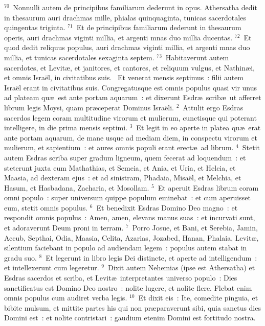 ${}^{70}$~Nonnulli autem de principibus familiarum dederunt in opus. Athersatha dedit in thesaurum auri drachmas mille, phialas quinquaginta, tunicas sacerdotales quingentas triginta.
${}^{71}$~Et de principibus familiarum dederunt in thesaurum operis, auri drachmas viginti millia, et argenti mnas duo millia ducentas.
${}^{72}$~Et quod dedit reliquus populus, auri drachmas viginti millia, et argenti mnas duo millia, et tunicas sacerdotales sexaginta septem.
${}^{73}$~Habitaverunt autem sacerdotes, et Levit\ae , et janitores, et cantores, et reliquum vulgus, et Nathin\ae i, et omnis Isra\"el, in civitatibus suis.
~Et venerat mensis septimus~: filii autem Isra\"el erant in civitatibus suis. Congregatusque est omnis populus quasi vir unus ad plateam qu\ae\ est ante portam aquarum~: et dixerunt Esdr\ae\ scrib\ae\ ut afferret librum legis Moysi, quam pr\ae ceperat Dominus Isra\"eli.
${}^{2}$~Attulit ergo Esdras sacerdos legem coram multitudine virorum et mulierum, cunctisque qui poterant intelligere, in die prima mensis septimi.
${}^{3}$~Et legit in eo aperte in platea qu\ae\ erat ante portam aquarum, de mane usque ad mediam diem, in conspectu virorum et mulierum, et sapientium~: et aures omnis populi erant erect\ae\ ad librum.
${}^{4}$~Stetit autem Esdras scriba super gradum ligneum, quem fecerat ad loquendum~: et steterunt juxta eum Mathathias, et Semeia, et Ania, et Uria, et Helcia, et Maasia, ad dexteram ejus~: et ad sinistram, Phadaia, Misa\"el, et Melchia, et Hasum, et Hasbadana, Zacharia, et Mosollam.
${}^{5}$~Et aperuit Esdras librum coram omni populo~: super universum quippe populum eminebat~: et cum aperuisset eum, stetit omnis populus.
${}^{6}$~Et benedixit Esdras Domino Deo magno~: et respondit omnis populus~: Amen, amen, elevans manus suas~: et incurvati sunt, et adoraverunt Deum proni in terram.
${}^{7}$~Porro Josue, et Bani, et Serebia, Jamin, Accub, Septhai, Odia, Maasia, Celita, Azarias, Jozabed, Hanan, Phalaia, Levit\ae , silentium faciebant in populo ad audiendam legem~: populus autem stabat in gradu suo.
${}^{8}$~Et legerunt in libro legis Dei distincte, et aperte ad intelligendum~: et intellexerunt cum legeretur.
${}^{9}$~Dixit autem Nehemias (ipse est Athersatha) et Esdras sacerdos et scriba, et Levit\ae\ interpretantes universo populo~: Dies sanctificatus est Domino Deo nostro~: nolite lugere, et nolite flere. Flebat enim omnis populus cum audiret verba legis.
${}^{10}$~Et dixit eis~: Ite, comedite pinguia, et bibite mulsum, et mittite partes his qui non pr\ae paraverunt sibi, quia sanctus dies Domini est~: et nolite contristari~: gaudium etenim Domini est fortitudo nostra.
